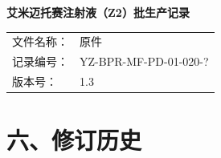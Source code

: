 \documentclass[UTF8,10pt,a4paper,fontset=fandol]{ctexart}
\newcommand{\fieldvalue}[1]{#1}
\begin{document}
\noindent
\begin{center}
\textbf{艾米迈托赛注射液（Z2）批生产记录}
\end{center}

\noindent
\begin{tabular}{@{}ll@{}}
文件名称：&
\fieldvalue{原件}\\
记录编号：&
\fieldvalue{YZ-BPR-MF-PD-01-020-?}\\
版本号：&
\fieldvalue{1.3}
\end{tabular}

\section*{六、修订历史}
\end{document}
